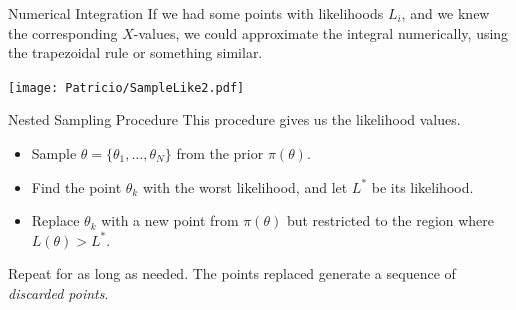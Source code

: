 \begin{frame}{Numerical Integration}
If we had some points with likelihoods $L_i$, and we knew the corresponding
$X$-values, we could approximate the integral numerically, using the
trapezoidal rule or something similar.
\begin{center}
\texttt{[image: Patricio/SampleLike2.pdf]}
\end{center}
\end{frame}
\begin{frame}{Nested Sampling Procedure}
This procedure gives us the likelihood values. \\

\begin{itemize}
	\item Sample $\theta=\{\theta_{1}, \ldots , \theta_{N}\}$ from the prior $\pi(\theta)$.
	\item Find the point $\theta_k$ with the worst
likelihood, and let $L^*$ be its likelihood.
	\item Replace $\theta_{k}$ with a new point from $\pi(\theta)$ but restricted to the region where $L(\theta)>L^*$.
\end{itemize}

Repeat for as long as needed.
The points replaced generate a sequence of \textit{discarded points}.
\end{frame}


